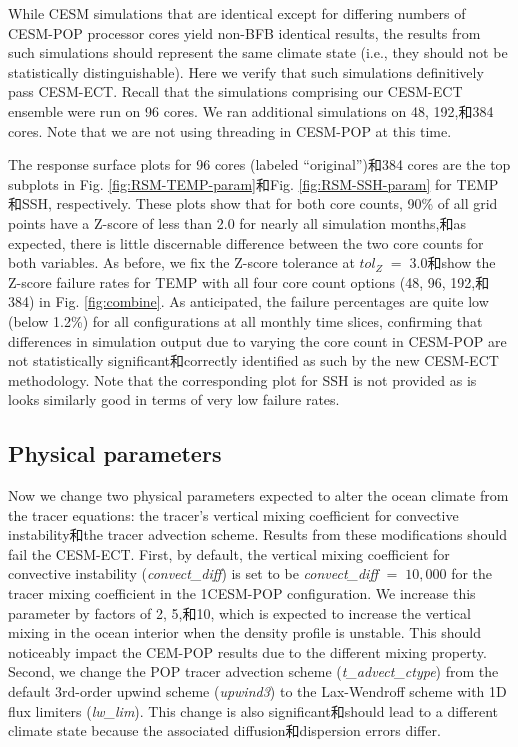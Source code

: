 While CESM simulations that are identical except for differing numbers of CESM-POP processor cores yield non-BFB identical results, the results from such simulations 
should represent the same climate state (i.e., they should not be statistically distinguishable). Here we verify that such simulations definitively pass CESM-ECT.  Recall that the simulations comprising our CESM-ECT ensemble were run on 96 cores.  We ran additional simulations on 48, 192,和384 cores.  Note that we are not using threading in CESM-POP at this time.

The response surface plots for 96 cores (labeled ``original'')和384 cores are the top subplots in Fig. \ref{fig:RSM-TEMP-param}和Fig. \ref{fig:RSM-SSH-param} for TEMP和SSH, respectively. These plots show that for both core counts, 90\% of all grid points have a Z-score of less than 2.0 for nearly all simulation months,和as expected, there is little discernable difference between the two core counts for both variables.  As before, we fix the Z-score tolerance at $tol_{Z} \; = \; 3.0$和show the Z-score failure rates for TEMP with all four core count options (48, 96, 192,和384) in Fig. \ref{fig:combine}.  As anticipated, the failure percentages are quite low (below 1.2\%) for all configurations at all monthly time slices, confirming that differences in simulation output due to varying the core count in CESM-POP are not statistically significant和correctly identified as such by the new CESM-ECT methodology.  Note that the corresponding plot for SSH is not provided as is looks similarly good in terms of very low failure rates.

 \subsection{Physical parameters}\label{sec:pp}

 Now we change two physical parameters expected to alter the ocean climate from the tracer equations: the tracer's vertical mixing coefficient for convective instability和the tracer advection scheme.  Results from these modifications should fail the CESM-ECT. First, by default, the vertical mixing coefficient for convective instability (\textit{convect\_diff}) is set to be \textit{convect\_diff} $=\; 10,000$ for the tracer mixing coefficient in the 1\degree CESM-POP configuration.  We increase this parameter by factors of 2, 5,和10, which is expected to increase the vertical mixing in the ocean interior when the density profile is unstable. This should noticeably impact the CEM-POP results due to the different mixing property.  Second, we change the POP tracer advection scheme (\textit{t\_advect\_ctype}) from the default 3rd-order upwind scheme (\textit{upwind3}) to the Lax-Wendroff scheme with 1D flux limiters (\textit{lw\_lim}). This change is also significant和should lead to a different climate state because the associated diffusion和dispersion errors differ.

